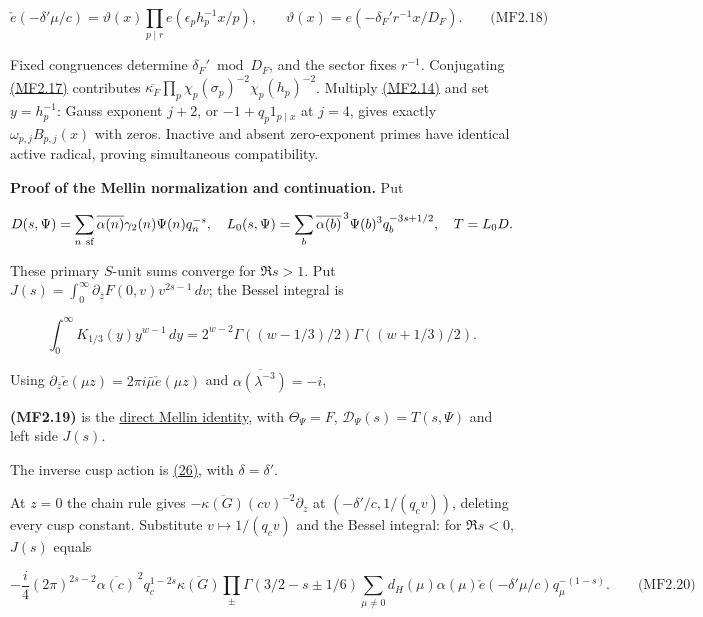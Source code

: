 \label{mf:eq:B2.18}

\[
\check e(-\delta'\mu/c)
=\vartheta(x)\prod_{p\mid r}e(\epsilon_ph_p^{-1}x/p),\qquad
\vartheta(x)=e(-\delta_F'r^{-1}x/D_F).
\qquad\text{(MF2.18)}
\]

Fixed congruences determine \(\delta_F'\bmod D_F\), and the sector fixes \(r^{-1}\). Conjugating \protect\hyperlink{mf:eq:B2.17}{(MF2.17)} contributes \(\overline{\kappa_F}\prod_p\chi_p(\sigma_p)^{-2}\chi_p(h_p)^{-2}\). Multiply \protect\hyperlink{mf:eq:B2.14}{(MF2.14)} and set \(y=h_p^{-1}\): Gauss exponent \(j+2\), or \(-1+q_p1_{p\mid x}\) at \(j=4\), gives exactly \(\omega_{p,j}B_{p,j}(x)\) with zeros. Inactive and absent zero-exponent primes have identical active radical, proving simultaneous compatibility.

\textbf{Proof of the Mellin normalization and continuation.} Put

\[
D(s,\Psi)=\sum_{n\ {\rm sf}}\overline{\alpha(n)}\gamma_2(n)\Psi(n)q_n^{-s},
\quad L_0(s,\Psi)=\sum_b\overline{\alpha(b)}^{\,3}\Psi(b)^3q_b^{-3s+1/2},
\quad T=L_0D.
\]

These primary \(S\)-unit sums converge for \(\Re s>1\). Put \(J(s)=\int_0^\infty\partial_{\bar z}F(0,v)v^{2s-1}\,dv\); the Bessel integral is

\[
\int_0^\infty K_{1/3}(y)y^{w-1}\,dy
=2^{w-2}\Gamma((w-1/3)/2)\Gamma((w+1/3)/2).
\]

Using \(\partial_{\bar z}\check e(\mu z)=2\pi i\bar\mu\check e(\mu z)\) and \(\overline{\alpha(\lambda^{-3})}=-i\),

\hypertarget{mf:eq:B2.19}{}

\label{mf:eq:B2.19}

\textbf{(MF2.19)} is the \protect\hyperlink{cf:direct-mellin-identity}{direct Mellin identity}, with \(\Theta_\Psi=F\), \(\mathcal D_\Psi(s)=T(s,\Psi)\) and left side \(J(s)\).

The inverse cusp action is \protect\hyperlink{cf:eq:B.10}{(26)}, with \(\delta=\delta'\).

At \(z=0\) the chain rule gives \(-\overline{\kappa(G)}(cv)^{-2}\partial_z\) at \((-\delta'/c,1/(q_cv))\), deleting every cusp constant. Substitute \(v\mapsto1/(q_cv)\) and the Bessel integral: for \(\Re s<0\), \(J(s)\) equals

\hypertarget{mf:eq:B2.20}{}

\label{mf:eq:B2.20}

\[
-\frac i4(2\pi)^{2s-2}\overline{\alpha(c)}^{\,2}q_c^{1-2s}
\overline{\kappa(G)}
\prod_\pm\Gamma(3/2-s\pm1/6)
\sum_{\mu\ne0}d_H(\mu)\alpha(\mu)\check e(-\delta'\mu/c)q_\mu^{-(1-s)}.
\qquad\text{(MF2.20)}
\]

